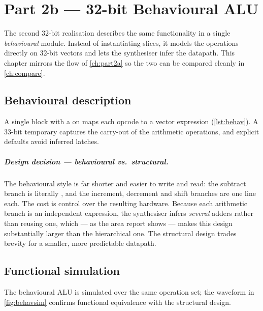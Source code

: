 \chapter{Part 2b --- 32-bit Behavioural ALU}
\label{ch:part2b}

The second 32-bit realisation describes the same functionality in a single
\emph{behavioural} module. Instead of instantiating slices, it models the
operations directly on 32-bit vectors and lets the synthesiser infer the
datapath. This chapter mirrors the flow of \cref{ch:part2a} so the two can
be compared cleanly in \cref{ch:compare}.

\section{Behavioural description}
A single  block with a  on \sel{} maps each
opcode to a vector expression (\cref{lst:behav}). A 33-bit temporary
captures the carry-out of the arithmetic operations, and explicit defaults
avoid inferred latches.



\paragraph{Design decision --- behavioural vs.\ structural.}
The behavioural style is far shorter and easier to write and read: the
subtract branch is literally , and the increment,
decrement and shift branches are one line each. The cost is control over
the resulting hardware. Because each arithmetic branch is an independent
\code{+} expression, the synthesiser infers \emph{several} adders rather
than reusing one, which --- as the area report shows --- makes this design
substantially larger than the hierarchical one. The structural design
trades brevity for a smaller, more predictable datapath.

\section{Functional simulation}
The behavioural ALU is simulated over the same operation set; the waveform
in \cref{fig:behavsim} confirms functional equivalence with the structural
design.


